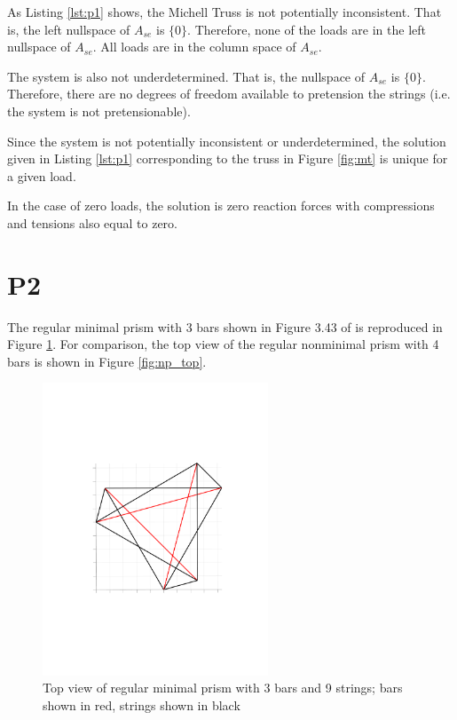 \documentclass{article}
\begin{document}
As Listing \ref{lst:p1} shows, the Michell Truss is not potentially inconsistent.
That is, the left nullspace of $A_{se}$ is $\{0\}$.
Therefore, none of the loads are in the left nullspace of $A_{se}$.
All loads are in the column space of $A_{se}$.

The system is also not underdetermined.
That is, the nullspace of $A_{se}$ is $\{0\}$.
Therefore, there are no degrees of freedom available to pretension the strings (i.e. the system is not pretensionable).

Since the system is not potentially inconsistent or underdetermined, the solution given in Listing \ref{lst:p1} corresponding to the truss in Figure \ref{fig:mt} is unique for a given load.

In the case of zero loads, the solution is zero reaction forces with compressions and tensions also equal to zero.


\section{P2}\label{sec:p2}

The regular minimal prism with 3 bars shown in Figure 3.43 of \cite{skelton} is reproduced in Figure \ref{fig:m3}.
For comparison, the top view of the regular nonminimal prism with 4 bars is shown in Figure \ref{fig:np_top}.

\begin{figure}[H]
  \centering
  \includegraphics[clip, trim=3.5cm 7.5cm 2.5cm 7.5cm, width=0.6\textwidth]{images/minimal_prism_3.pdf}
  \caption{Top view of regular minimal prism with 3 bars and 9 strings; bars shown in red, strings shown in black}
  \label{fig:m3}
\end{figure}
\end{document}
